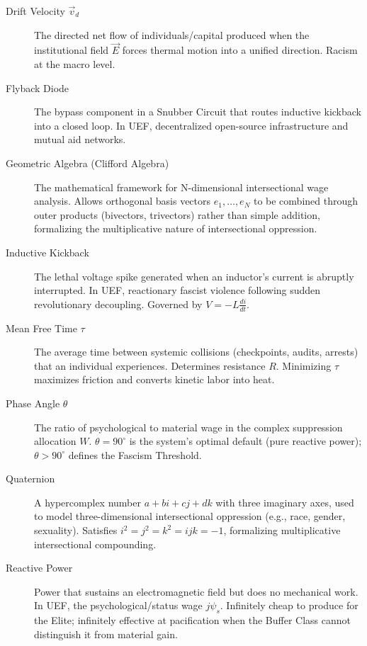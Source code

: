 \documentclass[12pt]{book}
\numberwithin{equation}{chapter}
\begin{document}
\begin{description}
\item[Drift Velocity $\vec{v}_d$] 
The directed net flow of individuals/capital produced when the institutional field $\vec{E}$ forces thermal motion into a unified direction. Racism at the macro level.

\item[Flyback Diode] 
The bypass component in a Snubber Circuit that routes inductive kickback into a closed loop. In UEF, decentralized open-source infrastructure and mutual aid networks.

\item[Geometric Algebra (Clifford Algebra)] 
The mathematical framework for N-dimensional intersectional wage analysis. Allows orthogonal basis vectors $e_1, \ldots, e_N$ to be combined through outer products (bivectors, trivectors) rather than simple addition, formalizing the multiplicative nature of intersectional oppression.

\item[Inductive Kickback] 
The lethal voltage spike generated when an inductor's current is abruptly interrupted. In UEF, reactionary fascist violence following sudden revolutionary decoupling. Governed by $V = -L \frac{di}{dt}$.

\item[Mean Free Time $\tau$] 
The average time between systemic collisions (checkpoints, audits, arrests) that an individual experiences. Determines resistance $R$. Minimizing $\tau$ maximizes friction and converts kinetic labor into heat.

\item[Phase Angle $\theta$] 
The ratio of psychological to material wage in the complex suppression allocation $W$. $\theta = 90^\circ$ is the system's optimal default (pure reactive power); $\theta > 90^\circ$ defines the Fascism Threshold.

\item[Quaternion] 
A hypercomplex number $a + bi + cj + dk$ with three imaginary axes, used to model three-dimensional intersectional oppression (e.g., race, gender, sexuality). Satisfies $i^2 = j^2 = k^2 = ijk = -1$, formalizing multiplicative intersectional compounding.

\item[Reactive Power] 
Power that sustains an electromagnetic field but does no mechanical work. In UEF, the psychological/status wage $j\psi_s$. Infinitely cheap to produce for the Elite; infinitely effective at pacification when the Buffer Class cannot distinguish it from material gain.


\end{description}
\end{document}

